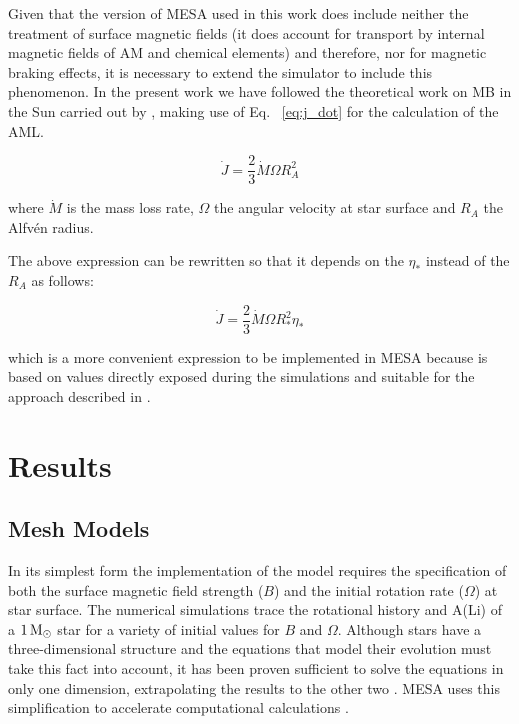 \documentclass[fleqn,usenatbib]{mnras}
\begin{document}
Given that the version of MESA used in this work does include neither the treatment of surface magnetic fields (it does account for transport by internal magnetic fields of AM and chemical elements) and therefore, nor for magnetic braking effects, it is necessary to extend the simulator to include this phenomenon. In the present work we have followed the theoretical work on MB in the Sun carried out by \citet{Weber1967}, making use of Eq.~ \ref{eq:j_dot} for the calculation of the AML.
\begin{ceqn}
\begin{equation}
 \Dot{J} = \frac{2}{3} \Dot{M}\Omega R^{2}_{A} \label{eq:j_dot}
\end{equation}
\end{ceqn}
where $\Dot{M}$ is the mass loss rate, $\Omega$ the angular velocity at star surface and $R_A$ the Alfv\'{e}n radius. \par

The above expression can be rewritten so that it depends on the $\eta_*$ instead of the $R_A$ as follows:
\begin{ceqn}
\begin{equation}
 \Dot{J} = \frac{2}{3} \Dot{M}\Omega R^{2}_{*}\eta_* \label{eq:j_dot_mesa}
\end{equation}
\end{ceqn}
which is a more convenient expression to be implemented in MESA because is based on values directly exposed during the simulations and suitable for the approach described in \citet{Ud-Doula2007}.

\section{Results} \label{sec_3}

\subsection{Mesh Models} \label{sec_mesh}

In its simplest form the implementation of the model requires the specification of both the surface magnetic field strength ($B$) and the initial rotation rate ($\Omega$) at star surface. The numerical simulations trace the rotational history and A(Li) of a $1\, \mathrm{M}_\odot$ star for a variety of initial values for $B$ and $\Omega$. Although stars have a three-dimensional structure and the equations that model their evolution must take this fact into account, it has been proven sufficient to solve the equations in only one dimension, extrapolating the results to the other two \citep[shellular approximation,][]{Meynet1997}. MESA uses this simplification to accelerate computational calculations \citep{Paxton2013}.\par
\end{document}
